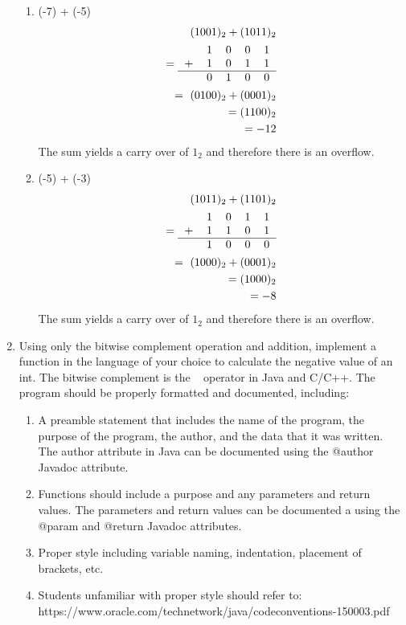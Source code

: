 \documentclass[12pt]{article}
\begin{document}
\begin{enumerate}
\begin{enumerate}
      \item (-7) + (-5)
      \begin{align*}
        (1001)_2 + (1011)_2 \\
        = \begin{tabular}{ccccc}
          & 1 & 0 & 0 & 1 \\
        + & 1 & 0 & 1 & 1 \\
        \hline
          & 0 & 1 & 0 & 0 \\
        \end{tabular} \\
        = ~(0100)_2 + (0001)_2 \\
        = (1100)_2 \\
        = -12
      \end{align*}
      The sum yields a carry over of $1_2$ and therefore there is an overflow.

      \item (-5) + (-3)
      \begin{align*}
        (1011)_2 + (1101)_2 \\
        = \begin{tabular}{ccccc}
          & 1 & 0 & 1 & 1 \\
        + & 1 & 1 & 0 & 1 \\
        \hline
          & 1 & 0 & 0 & 0 \\
        \end{tabular} \\
        = ~(1000)_2 + (0001)_2 \\
        = (1000)_2 \\
        = -8
      \end{align*}
      The sum yields a carry over of $1_2$ and therefore there is an overflow.

    \end{enumerate}

    \item Using only the bitwise complement operation and addition, implement a function in the language of your choice to calculate the negative value of an int. The bitwise complement is the ~ operator in Java and C/C++. The program should be properly formatted and documented, including:
    \begin{enumerate}
      \item A preamble statement that includes the name of the program, the purpose of the program, the author, and the data that it was written. The author attribute in Java can be documented using the @author Javadoc attribute.
      \item Functions should include a purpose and any parameters and return values. The parameters and return values can be documented a using the @param and @return Javadoc attributes.
      \item Proper style including variable naming, indentation, placement of brackets, etc.
      \item Students unfamiliar with proper style should refer to: https://www.oracle.com/technetwork/java/codeconventions-150003.pdf
    \end{enumerate}


\end{enumerate}
\end{document}
